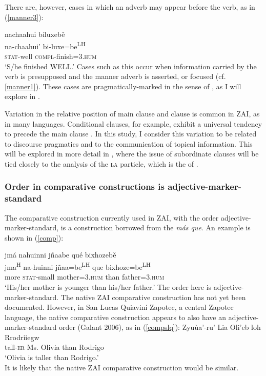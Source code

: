 There are, however, cases in which an adverb may appear before the verb, as in (\ref{manner3}):

\ea\label{manner3}
\glll nachaahui b\'{i}luxeb\v{e} \\
na-chaahui' bi-luxe=be\textsuperscript{LH} \\
\textsc{stat}-well \textsc{compl}-finish=\textsc{3.hum} \\
\glt `S/he finished WELL.'
\z
Cases such as this occur when information carried by the verb is presupposed and the manner adverb is asserted, or focused (cf. \ref{manner1}). These cases are pragmatically-marked in the sense of \citet{payne1995}, as I will explore in .

Variation in the relative position of main clause and  clause is common in ZAI, as in many languages. Conditional clauses, for example, exhibit a universal tendency to precede the main clause \citep{haiman1978}. In this study, I consider this variation to be related to discourse pragmatics and to the communication of topical information. This will be explored in more detail in , where the issue of subordinate  clauses will be tied closely to the analysis of the \textsc{la} particle, which is the  of .


\subsubsection{Order in comparative constructions is adjective-marker-standard}

The comparative construction currently used in ZAI, with the order adjective-marker-standard, is a construction borrowed from the  \textit{m\'{a}s que}. An example is shown in (\ref{comp}):

\ea\label{comp}
\glll jm\'{a} nahuinni jñaabe qu\'{e} bixhozeb\v{e} \\
jma\textsuperscript{H} na-huinni jñaa=be\textsuperscript{LH} que bixhoze=be\textsuperscript{LH} \\
more \textsc{stat}-small mother=\textsc{3.hum} than father=\textsc{3.hum} \\
\glt `His/her mother is younger than his/her father.'
\z
The order here is adjective-marker-standard. The native ZAI comparative construction has not yet been documented. However, in San Lucas Quiavin\'{i} Zapotec, a central Zapotec language, the native comparative construction appears to also have an adjective-marker-standard order (Galant 2006), as in (\ref{compslq}):
\ea\label{compslq}
\gll Zyu\`{u}a'-ru' Lia Oli'eb loh Rrodriiegw \\
tall-\textsc{er} Ms. Olivia than Rodrigo \\
\glt `Olivia is taller than Rodrigo.' \\
\z
It is likely that the native ZAI comparative construction would be similar.


